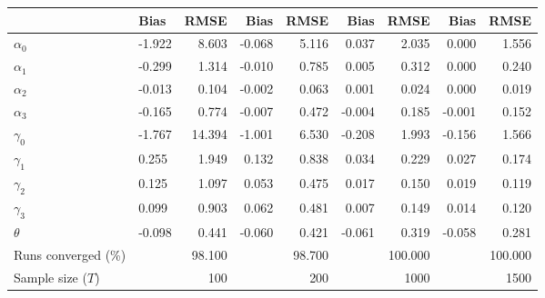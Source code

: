 
\begin{tabular}[t]{llrrrrrrr}
\toprule
  & Bias & RMSE & Bias & RMSE & Bias & RMSE & Bias & RMSE\\
\midrule
$\alpha_{0}$ & -1.922 & 8.603 & -0.068 & 5.116 & 0.037 & 2.035 & 0.000 & 1.556\\
$\alpha_{1}$ & -0.299 & 1.314 & -0.010 & 0.785 & 0.005 & 0.312 & 0.000 & 0.240\\
$\alpha_{2}$ & -0.013 & 0.104 & -0.002 & 0.063 & 0.001 & 0.024 & 0.000 & 0.019\\
$\alpha_{3}$ & -0.165 & 0.774 & -0.007 & 0.472 & -0.004 & 0.185 & -0.001 & 0.152\\
$\gamma_{0}$ & -1.767 & 14.394 & -1.001 & 6.530 & -0.208 & 1.993 & -0.156 & 1.566\\
$\gamma_{1}$ & 0.255 & 1.949 & 0.132 & 0.838 & 0.034 & 0.229 & 0.027 & 0.174\\
$\gamma_{2}$ & 0.125 & 1.097 & 0.053 & 0.475 & 0.017 & 0.150 & 0.019 & 0.119\\
$\gamma_{3}$ & 0.099 & 0.903 & 0.062 & 0.481 & 0.007 & 0.149 & 0.014 & 0.120\\
$\theta$ & -0.098 & 0.441 & -0.060 & 0.421 & -0.061 & 0.319 & -0.058 & 0.281\\
Runs converged (\%) &  & 98.100 &  & 98.700 &  & 100.000 &  & 100.000\\
Sample size ($T$) &  & 100 &  & 200 &  & 1000 &  & 1500\\
\bottomrule
\end{tabular}
